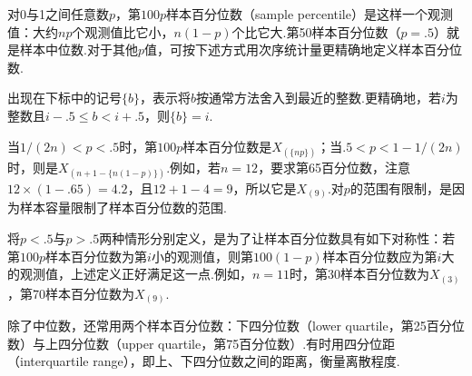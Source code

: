 对0与1之间任意数$p$，第$100p$样本百分位数（sample percentile）是这样一个观测值：大约$np$个观测值比它小，$n(1-p)$个比它大.第50样本百分位数（$p=.5$）就是样本中位数.对于其他$p$值，可按下述方式用次序统计量更精确地定义样本百分位数.
\begin{definition}\label{def:5.4.2}
出现在下标中的记号$\{b\}$，表示将$b$按通常方法舍入到最近的整数.更精确地，若$i$为整数且$i-.5\le b<i+.5$，则$\{b\}=i$.
\end{definition}
当$1/(2n)<p<.5$时，第$100p$样本百分位数是$X_{(\{np\})}$；当$.5<p<1-1/(2n)$时，则是$X_{(n+1-\{n(1-p)\})}$.例如，若$n=12$，要求第65百分位数，注意$12\times(1-.65)=4.2$，且$12+1-4=9$，所以它是$X_{(9)}$.对$p$的范围有限制，是因为样本容量限制了样本百分位数的范围.

将$p<.5$与$p>.5$两种情形分别定义，是为了让样本百分位数具有如下对称性：若第$100p$样本百分位数为第$i$小的观测值，则第$100(1-p)$样本百分位数应为第$i$大的观测值，上述定义正好满足这一点.例如，$n=11$时，第30样本百分位数为$X_{(3)}$，第70样本百分位数为$X_{(9)}$.

除了中位数，还常用两个样本百分位数：下四分位数（lower quartile，第25百分位数）与上四分位数（upper quartile，第75百分位数）.有时用四分位距（interquartile range），即上、下四分位数之间的距离，衡量离散程度.

